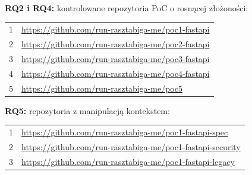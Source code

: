 \documentclass[
    bindingoffset=5mm,  %
    footnoteindent=3mm, %
    hyphenation=true    %
]{src/wut-thesis}
\begin{document}
\label{att:h2-h5-dataset}

\textbf{RQ2 i RQ4:} kontrolowane repozytoria PoC o rosnącej złożoności:

\begin{tabular}{r l}
1 & \url{https://github.com/run-rasztabiga-me/poc1-fastapi} \\
2 & \url{https://github.com/run-rasztabiga-me/poc2-fastapi} \\
3 & \url{https://github.com/run-rasztabiga-me/poc3-fastapi} \\
4 & \url{https://github.com/run-rasztabiga-me/poc4-fastapi} \\
5 & \url{https://github.com/run-rasztabiga-me/poc5} \\
\end{tabular}

\textbf{RQ5:} repozytoria z manipulacją kontekstem:

\begin{tabular}{r l}
1 & \url{https://github.com/run-rasztabiga-me/poc1-fastapi-spec} \\
2 & \url{https://github.com/run-rasztabiga-me/poc1-fastapi-security} \\
3 & \url{https://github.com/run-rasztabiga-me/poc1-fastapi-legacy} \\
\end{tabular}
\end{document}
